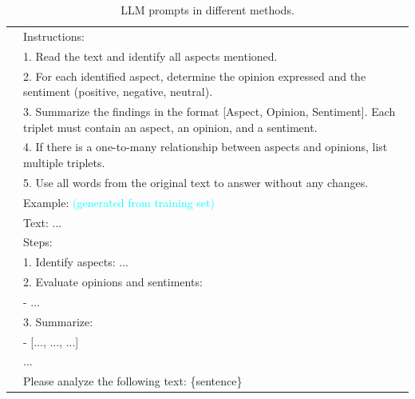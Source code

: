 \documentclass[11pt]{article}
\begin{document}
\begin{table}
{\begin{tabular}{lp{40em}}
    &Instructions:\\
    &1. Read the text and identify all aspects mentioned.\\
    &2. For each identified aspect, determine the opinion expressed and the sentiment (positive, negative, neutral).\\
    &3. Summarize the findings in the format [Aspect, Opinion, Sentiment]. Each triplet must contain an aspect, an opinion, and a sentiment.\\
    &4. If there is a one-to-many relationship between aspects and opinions, list multiple triplets.\\
    &5. Use all words from the original text to answer without any changes.\\
    
    &Example: \textcolor{cyan}{(generated from training set)}\\
    &Text: ...\\
    
    &Steps:\\
    &1. Identify aspects: ...\\
    &2. Evaluate opinions and sentiments:\\
    &    - ...\\
    &3. Summarize:\\
    &    - [..., ..., ...]\\
    &...\\
    &Please analyze the following text: \{sentence\}\\
    \bottomrule
    \hline
    \end{tabular}%
    }
\caption{LLM prompts in different methods.}
\label{LLM prompts}
\end{table}
\end{document}
